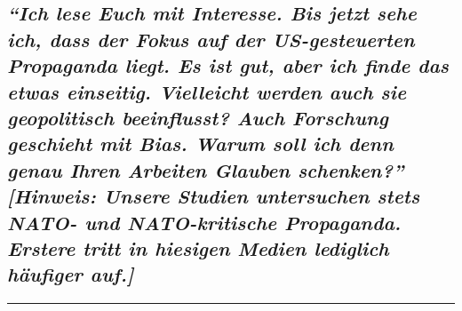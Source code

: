 \hypertarget{ich-lese-euch-mit-interesse-bis-jetzt-sehe-ich-dass-der-fokus-auf-der-us-gesteuerten-propaganda-liegt-es-ist-gut-aber-ich-finde-das-etwas-einseitig-vielleicht-werden-auch-sie-geopolitisch-beeinflusst-auch-forschung-geschieht-mit-bias-warum-soll-ich-denn-genau-ihren-arbeiten-glauben-schenken-hinweis-unsere-studien-untersuchen-stets-nato--und-nato-kritische-propaganda-erstere-tritt-in-hiesigen-medien-lediglich-huxe4ufiger-auf}{%
\subsection{\texorpdfstring{\emph{``Ich lese Euch mit Interesse. Bis
jetzt sehe ich, dass der Fokus auf der US-gesteuerten Propaganda liegt.
Es ist gut, aber ich finde das etwas einseitig. Vielleicht werden auch
sie geopolitisch beeinflusst? Auch Forschung geschieht mit Bias. Warum
soll ich denn genau Ihren Arbeiten Glauben schenken?'' {[}Hinweis:
Unsere Studien untersuchen stets NATO- und NATO-kritische Propaganda.
Erstere tritt in hiesigen Medien lediglich häufiger
auf.{]}}}{``Ich lese Euch mit Interesse. Bis jetzt sehe ich, dass der Fokus auf der US-gesteuerten Propaganda liegt. Es ist gut, aber ich finde das etwas einseitig. Vielleicht werden auch sie geopolitisch beeinflusst? Auch Forschung geschieht mit Bias. Warum soll ich denn genau Ihren Arbeiten Glauben schenken?'' {[}Hinweis: Unsere Studien untersuchen stets NATO- und NATO-kritische Propaganda. Erstere tritt in hiesigen Medien lediglich häufiger auf.{]}}}\label{ich-lese-euch-mit-interesse-bis-jetzt-sehe-ich-dass-der-fokus-auf-der-us-gesteuerten-propaganda-liegt-es-ist-gut-aber-ich-finde-das-etwas-einseitig-vielleicht-werden-auch-sie-geopolitisch-beeinflusst-auch-forschung-geschieht-mit-bias-warum-soll-ich-denn-genau-ihren-arbeiten-glauben-schenken-hinweis-unsere-studien-untersuchen-stets-nato--und-nato-kritische-propaganda-erstere-tritt-in-hiesigen-medien-lediglich-huxe4ufiger-auf}}

\begin{center}\rule{0.5\linewidth}{\linethickness}\end{center}

